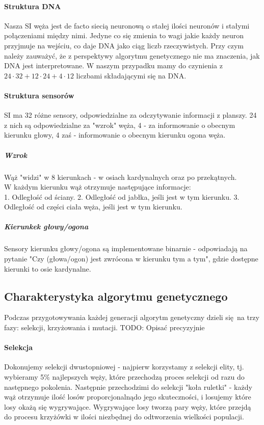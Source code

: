 \documentclass{article}
\begin{document}
\paragraph{Struktura DNA}
Nasza SI węża jest de facto siecią neuronową o stałej ilości neuronów i stałymi połączeniami między nimi. 
Jedyne co się zmienia to wagi jakie każdy neuron przyjmuje na wejściu, co daje DNA jako ciąg liczb rzeczywistych.
Przy czym należy zauważyć, że z perspektywy algorytmu genetycznego nie ma znaczenia, jak DNA jest interpretowane.
W naszym przypadku mamy do czynienia z $24\cdot32+12\cdot24+4\cdot12$ liczbami składającymi się na DNA.
\paragraph{Struktura sensorów}
SI ma 32 różne sensory, odpowiedzialne za odczytywanie informacji z planszy.
24 z nich są odpowiedzialne za "wzrok" węża, 4 - za informowanie o obecnym kierunku głowy, 4 zaś - informowanie o obecnym kierunku ogona węża.
\subparagraph{Wzrok}
Wąż "widzi" w 8 kierunkach - w osiach kardynalnych oraz po przekątnych. \\
W każdym kierunku wąż otrzymuje następujące informacje: \\
1. Odległość od ściany.
2. Odległość od jabłka, jeśli jest w tym kierunku. 
3. Odległość od części ciała węża, jeśli jest w tym kierunku.
\subparagraph{Kierunkek głowy/ogona}
Sensory kierunku głowy/ogona są implementowane binarnie - odpowiadają na pytanie "Czy (głowa/ogon) jest zwrócona w kierunku tym a tym", gdzie dostępne kierunki to osie kardynalne.
\subsection{Charakterystyka algorytmu genetycznego}
Podczas przygotowywania każdej generacji algorytm genetyczny dzieli się na trzy fazy: selekcji, krzyżowania i mutacji.
TODO: Opisać precyzyjnie
\paragraph{Selekcja}
Dokonujemy selekcji dwustopniowej - najpierw korzystamy z selekcji elity, tj. wybieramy 5\% najlepszych węży, które przechodzą proces selekcji od razu do następnego pokolenia.
Następnie przechodzimi do selekcji "koła ruletki" - każdy wąż otrzymuje ilość losów proporcjonalnądo jego skuteczności, i losujemy które losy okażą się wygrywające.
Wygrywające losy tworzą pary węży, które przejdą do procesu krzyżówki w ilości niezbędnej do odtworzenia wielkości populacji.
\end{document}
